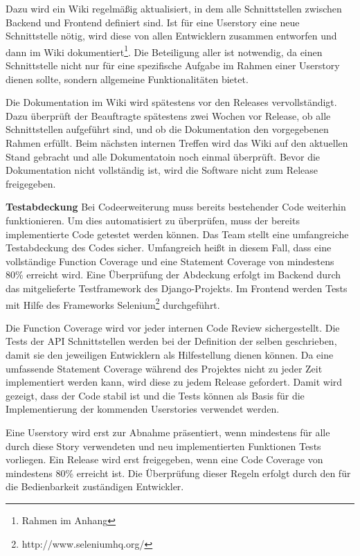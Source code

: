 \documentclass[accentcolor=tud0b,12pt,paper=a4]{tudreport}
\begin{document}
Dazu wird ein Wiki regelmäßig aktualisiert, in dem alle Schnittstellen zwischen Backend und Frontend definiert sind. Ist für eine Userstory eine neue Schnittstelle nötig, wird diese von allen Entwicklern zusammen entworfen und dann im Wiki dokumentiert\footnote{Rahmen im Anhang}. Die Beteiligung aller ist notwendig, da einen Schnittstelle nicht nur für eine spezifische Aufgabe im Rahmen einer Userstory dienen sollte, sondern allgemeine Funktionalitäten bietet.

Die Dokumentation im Wiki wird spätestens vor den Releases vervollständigt. Dazu überprüft der Beauftragte spätestens zwei Wochen vor Release, ob alle Schnittstellen aufgeführt sind, und ob die Dokumentation den vorgegebenen Rahmen erfüllt. Beim nächsten internen Treffen wird das Wiki auf den aktuellen Stand gebracht und alle Dokumentatoin noch einmal überprüft. Bevor die Dokumentation nicht vollständig ist, wird die Software nicht zum Release freigegeben.


\textbf{Testabdeckung}
Bei Codeerweiterung muss bereits bestehender Code weiterhin funktionieren. Um dies automatisiert zu überprüfen, muss der bereits implementierte Code getestet werden können. Das Team stellt eine umfangreiche Testabdeckung des Codes sicher. Umfangreich heißt in diesem Fall, dass eine vollständige Function Coverage und eine Statement Coverage von mindestens 80\% erreicht wird. Eine Überprüfung der Abdeckung erfolgt im Backend durch das mitgelieferte Testframework des Django-Projekts. Im Frontend werden Tests mit Hilfe des Frameworks Selenium\footnote{http://www.seleniumhq.org/} durchgeführt.

Die Function Coverage wird vor jeder internen Code Review sichergestellt. Die Tests der API Schnittstellen werden bei der Definition der selben geschrieben, damit sie den jeweiligen Entwicklern als Hilfestellung dienen können. Da eine umfassende Statement Coverage während des Projektes nicht zu jeder Zeit implementiert werden kann, wird diese zu jedem Release gefordert. Damit wird gezeigt, dass der Code stabil ist und die Tests können als Basis für die Implementierung der kommenden Userstories verwendet werden.

Eine Userstory wird erst zur Abnahme präsentiert, wenn mindestens für alle durch diese Story verwendeten und neu implementierten Funktionen Tests vorliegen. Ein Release wird erst freigegeben, wenn eine Code Coverage von mindestens 80\% erreicht ist. Die Überprüfung dieser Regeln erfolgt durch den für die Bedienbarkeit zuständigen Entwickler.
\end{document}
